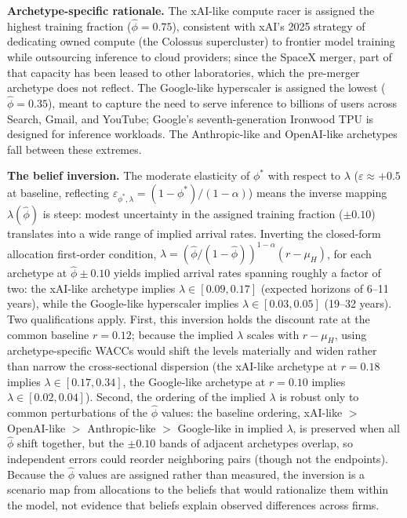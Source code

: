 \documentclass[
  11pt,
  letterpaper,
]{scrartcl}
\begin{document}
\textbf{Archetype-specific rationale.} The xAI-like compute racer is
assigned the highest training fraction (\(\hat{\phi} = 0.75\)),
consistent with xAI's 2025 strategy of dedicating owned compute (the
Colossus supercluster) to frontier model training while outsourcing
inference to cloud providers; since the SpaceX merger, part of that
capacity has been leased to other laboratories, which the pre-merger
archetype does not reflect. The Google-like hyperscaler is assigned the
lowest (\(\hat{\phi} = 0.35\)), meant to capture the need to serve
inference to billions of users across Search, Gmail, and YouTube;
Google's seventh-generation Ironwood TPU is designed for inference
workloads. The Anthropic-like and OpenAI-like archetypes fall between
these extremes.

\textbf{The belief inversion.} The moderate elasticity of \(\phi^*\)
with respect to \(\lambda\) (\(\varepsilon \approx +0.5\) at baseline,
reflecting \(\varepsilon_{\phi^*,\lambda} = (1-\phi^*)/(1-\alpha)\))
means the inverse mapping \(\lambda(\hat{\phi})\) is steep: modest
uncertainty in the assigned training fraction (\(\pm 0.10\)) translates
into a wide range of implied arrival rates. Inverting the closed-form
allocation first-order condition,
\(\lambda = (\hat{\phi}/(1-\hat{\phi}))^{1-\alpha}(r - \mu_H)\), for
each archetype at \(\hat{\phi} \pm 0.10\) yields implied arrival rates
spanning roughly a factor of two: the xAI-like archetype implies
\(\lambda \in [0.09, 0.17]\) (expected horizons of 6--11 years), while
the Google-like hyperscaler implies \(\lambda \in [0.03, 0.05]\) (19--32
years). Two qualifications apply. First, this inversion holds the
discount rate at the common baseline \(r = 0.12\); because the implied
\(\lambda\) scales with \(r - \mu_H\), using archetype-specific WACCs
would shift the levels materially and widen rather than narrow the
cross-sectional dispersion (the xAI-like archetype at \(r = 0.18\)
implies \(\lambda \in [0.17, 0.34]\), the Google-like archetype at
\(r = 0.10\) implies \(\lambda \in [0.02, 0.04]\)). Second, the ordering
of the implied \(\lambda\) is robust only to common perturbations of the
\(\hat{\phi}\) values: the baseline ordering, xAI-like \(>\) OpenAI-like
\(>\) Anthropic-like \(>\) Google-like in implied \(\lambda\), is
preserved when all \(\hat{\phi}\) shift together, but the \(\pm 0.10\)
bands of adjacent archetypes overlap, so independent errors could
reorder neighboring pairs (though not the endpoints). Because the
\(\hat{\phi}\) values are assigned rather than measured, the inversion
is a scenario map from allocations to the beliefs that would rationalize
them within the model, not evidence that beliefs explain observed
differences across firms.
\end{document}

